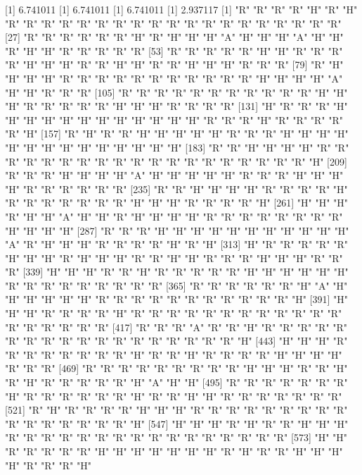 [1] 6.741011
[1] 6.741011
[1] 6.741011
[1] 2.937117
   [1] "R" "R" "R" "R" "H" "R" "H" "R" "R" "R" "R" "R" "R" "R" "R" "R" "R" "R" "R" "R" "R" "R" "R" "R" "R" "R"
  [27] "R" "R" "R" "R" "R" "R" "H" "R" "H" "H" "H" "A" "H" "H" "H" "A" "H" "H" "R" "H" "H" "R" "R" "R" "R" "R"
  [53] "R" "R" "R" "R" "R" "H" "H" "R" "R" "R" "R" "H" "H" "H" "R" "R" "H" "H" "R" "R" "H" "H" "H" "R" "R" "R"
  [79] "R" "H" "H" "H" "H" "R" "R" "R" "R" "R" "R" "R" "R" "R" "R" "R" "H" "H" "H" "H" "A" "H" "H" "R" "R" "R"
 [105] "R" "R" "R" "R" "R" "R" "R" "R" "R" "R" "R" "H" "H" "H" "R" "R" "R" "R" "R" "H" "H" "H" "R" "R" "R" "R"
 [131] "H" "R" "R" "R" "H" "H" "H" "H" "H" "H" "H" "H" "H" "H" "H" "H" "R" "R" "R" "H" "R" "R" "R" "R" "R" "H"
 [157] "R" "H" "R" "R" "H" "H" "H" "H" "H" "R" "R" "R" "H" "H" "H" "H" "H" "H" "H" "H" "H" "H" "H" "H" "H" "H"
 [183] "R" "R" "H" "H" "H" "H" "R" "R" "R" "R" "R" "R" "R" "R" "R" "R" "R" "R" "R" "R" "R" "R" "R" "R" "R" "H"
 [209] "R" "R" "R" "H" "H" "H" "H" "A" "H" "H" "H" "H" "H" "R" "R" "R" "H" "H" "H" "H" "R" "R" "R" "R" "R" "R"
 [235] "R" "R" "H" "H" "H" "H" "R" "R" "R" "R" "H" "R" "R" "R" "R" "R" "R" "R" "H" "H" "H" "R" "R" "R" "R" "H"
 [261] "H" "H" "H" "R" "H" "H" "A" "H" "H" "R" "H" "H" "H" "H" "R" "R" "R" "R" "R" "R" "R" "R" "H" "H" "H" "H"
 [287] "R" "R" "R" "H" "H" "H" "H" "H" "H" "H" "H" "H" "H" "H" "A" "R" "H" "H" "H" "R" "R" "R" "R" "H" "R" "H"
 [313] "H" "R" "R" "R" "R" "R" "H" "H" "H" "R" "H" "H" "H" "R" "R" "H" "H" "R" "R" "R" "H" "H" "H" "R" "R" "R"
 [339] "H" "H" "H" "R" "R" "H" "R" "R" "R" "R" "R" "H" "H" "H" "H" "H" "H" "R" "R" "R" "R" "R" "R" "R" "R" "R"
 [365] "R" "R" "R" "R" "R" "R" "H" "A" "H" "H" "H" "H" "H" "H" "R" "R" "R" "R" "R" "R" "R" "R" "R" "R" "R" "H"
 [391] "H" "H" "H" "R" "R" "R" "R" "H" "R" "R" "R" "R" "R" "R" "R" "R" "R" "R" "R" "R" "R" "R" "R" "R" "R" "R"
 [417] "R" "R" "R" "A" "R" "R" "H" "R" "R" "R" "R" "R" "R" "R" "R" "R" "R" "R" "R" "R" "R" "R" "R" "R" "R" "H"
 [443] "H" "H" "H" "R" "R" "R" "R" "R" "R" "R" "R" "H" "R" "R" "H" "R" "R" "R" "R" "H" "H" "H" "H" "R" "R" "R"
 [469] "R" "R" "R" "R" "R" "R" "R" "R" "R" "H" "H" "H" "R" "R" "H" "R" "H" "R" "R" "R" "R" "R" "H" "A" "H" "H"
 [495] "R" "R" "R" "R" "R" "R" "R" "H" "R" "R" "R" "R" "R" "R" "H" "R" "R" "H" "H" "R" "R" "R" "R" "R" "R" "R"
 [521] "R" "H" "R" "R" "R" "R" "H" "H" "H" "R" "R" "R" "R" "R" "R" "R" "R" "R" "R" "R" "R" "R" "R" "R" "R" "H"
 [547] "H" "H" "H" "R" "H" "R" "R" "H" "H" "H" "R" "R" "R" "R" "R" "R" "R" "R" "R" "R" "R" "R" "R" "R" "R" "R"
 [573] "H" "H" "R" "R" "R" "R" "R" "H" "H" "H" "H" "H" "H" "H" "R" "H" "R" "R" "H" "H" "H" "H" "R" "R" "R" "H"
